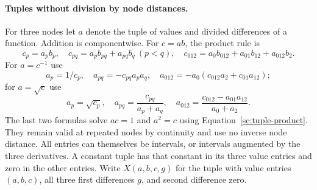 \paragraph{Tuples without division by node distances.}
For three nodes let $a$ denote the tuple of values and divided differences
of a function.  Addition is componentwise.  For $c=ab$, the product rule is
\begin{equation}\label{sc:tuple-product}
 c_p=a_pb_p,\quad
 c_{pq}=a_pb_{pq}+a_{pq}b_q\ (p<q),\quad
 c_{012}=a_0b_{012}+a_{01}b_{12}+a_{012}b_2.
\end{equation}
For $a=c^{-1}$ use
\begin{equation}\label{sc:tuple-reciprocal}
 a_p=1/c_p,\quad a_{pq}=-c_{pq}a_pa_q,\quad
 a_{012}=-a_0(c_{012}a_2+c_{01}a_{12});
\end{equation}
for $a=\sqrt c$ use
\begin{equation}\label{sc:tuple-root}
 a_p=\sqrt{c_p},\quad a_{pq}=\frac{c_{pq}}{a_p+a_q},\quad
 a_{012}=\frac{c_{012}-a_{01}a_{12}}{a_0+a_2}.
\end{equation}
The last two formulas solve $ac=1$ and $a^2=c$ using
Equation~\eqref{sc:tuple-product}.  They remain valid at repeated nodes by
continuity and use no inverse node distance.  All entries can themselves
be intervals, or intervals augmented by the three derivatives.  A constant
tuple has that constant in its three value entries and zero in the other
entries.  Write $X(a,b,c,g)$ for the tuple with value entries $(a,b,c)$,
all three first differences $g$, and second difference zero.

